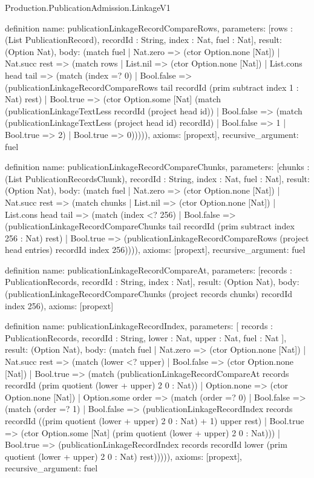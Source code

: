 \begin{lexlean}{Production.PublicationAdmission.LinkageV1}
\begin{semanticmodule}
definition{
  name: publicationLinkageRecordCompareRows,
  parameters: [rows : (List PublicationRecord), recordId : String, index : Nat, fuel : Nat],
  result: (Option Nat),
  body: (match fuel
    | Nat.zero => (ctor Option.none [Nat])
    | Nat.succ rest => (match rows
      | List.nil => (ctor Option.none [Nat])
      | List.cons head tail => (match (index =? 0)
        | Bool.false => (publicationLinkageRecordCompareRows tail recordId (prim subtract index 1 : Nat) rest)
        | Bool.true => (ctor Option.some [Nat] (match (publicationLinkageTextLess recordId (project head id))
          | Bool.false => (match (publicationLinkageTextLess (project head id) recordId)
            | Bool.false => 1
            | Bool.true => 2)
          | Bool.true => 0))))),
  axioms: [propext],
  recursive_argument: fuel
}

definition{
  name: publicationLinkageRecordCompareChunks,
  parameters: [chunks : (List PublicationRecordsChunk), recordId : String, index : Nat, fuel : Nat],
  result: (Option Nat),
  body: (match fuel
    | Nat.zero => (ctor Option.none [Nat])
    | Nat.succ rest => (match chunks
      | List.nil => (ctor Option.none [Nat])
      | List.cons head tail => (match (index <? 256)
        | Bool.false => (publicationLinkageRecordCompareChunks tail recordId (prim subtract index 256 : Nat) rest)
        | Bool.true => (publicationLinkageRecordCompareRows (project head entries) recordId index 256)))),
  axioms: [propext],
  recursive_argument: fuel
}

definition{
  name: publicationLinkageRecordCompareAt,
  parameters: [records : PublicationRecords, recordId : String, index : Nat],
  result: (Option Nat),
  body: (publicationLinkageRecordCompareChunks (project records chunks) recordId index 256),
  axioms: [propext]
}

definition{
  name: publicationLinkageRecordIndex,
  parameters: [
    records : PublicationRecords,
    recordId : String,
    lower : Nat,
    upper : Nat,
    fuel : Nat
  ],
  result: (Option Nat),
  body: (match fuel
    | Nat.zero => (ctor Option.none [Nat])
    | Nat.succ rest => (match (lower <? upper)
      | Bool.false => (ctor Option.none [Nat])
      | Bool.true => (match (publicationLinkageRecordCompareAt records recordId (prim quotient (lower + upper) 2 0 : Nat))
        | Option.none => (ctor Option.none [Nat])
        | Option.some order => (match (order =? 0)
          | Bool.false => (match (order =? 1)
            | Bool.false => (publicationLinkageRecordIndex records recordId ((prim quotient (lower + upper) 2 0 : Nat) + 1) upper rest)
            | Bool.true => (ctor Option.some [Nat] (prim quotient (lower + upper) 2 0 : Nat)))
          | Bool.true => (publicationLinkageRecordIndex records recordId lower (prim quotient (lower + upper) 2 0 : Nat) rest))))),
  axioms: [propext],
  recursive_argument: fuel
}


\end{semanticmodule}
\end{lexlean}
